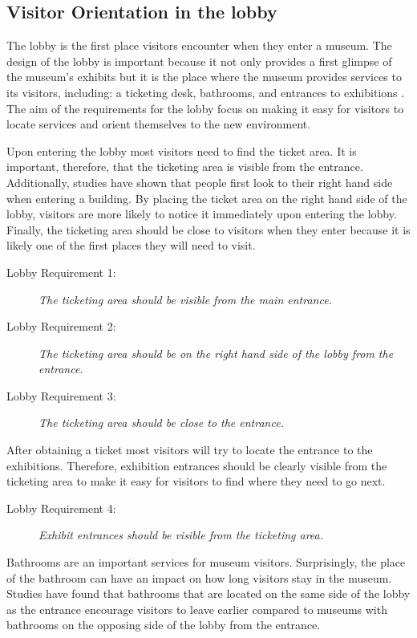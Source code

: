 \documentclass[12pt]{ucthesis}
\begin{document}
\subsection{Visitor Orientation in the lobby}
The lobby is the first place visitors encounter when they enter a museum. The design of the lobby is important because it not only provides a first glimpse of the museum's exhibits but it is the place where the museum provides services to its visitors, including: a ticketing desk, bathrooms, and entrances to exhibitions \cite{Bitgood02}. The aim of the requirements for the lobby focus on making it easy for visitors to locate services and orient themselves to the new environment. 

Upon entering the lobby most visitors need to find the ticket area. It is important, therefore, that the ticketing area is visible from the entrance. Additionally, studies have shown that people first look to their right hand side when entering a building. By placing the ticket area on the right hand side of the lobby, visitors are more likely to notice it immediately upon entering the lobby. Finally, the ticketing area should be close to visitors when they enter because it is likely one of the first places they will need to visit.
\begin{description}
\item[Lobby Requirement 1:] \emph{The ticketing area should be visible from the main entrance.}
\item[Lobby Requirement 2:] \emph{The ticketing area should be on the right hand side of the lobby from the entrance.}
\item[Lobby Requirement 3:] \emph{The ticketing area should be close to the entrance.}
\end{description}

After obtaining a ticket most visitors will try to locate the entrance to the exhibitions. Therefore, exhibition entrances should be clearly visible from the ticketing area to make it easy for visitors to find where they need to go next. 
\begin{description}
\item[Lobby Requirement 4:] \emph{Exhibit entrances should be visible from the ticketing area.}
\end{description}

Bathrooms are an important services for museum visitors. Surprisingly, the place of the bathroom can have an impact on how long visitors stay in the museum. Studies \cite{tbd} have found that bathrooms that are located on the same side of the lobby as the entrance encourage visitors to leave earlier compared to museums with bathrooms on the opposing side of the lobby from the entrance. 
\end{document}
